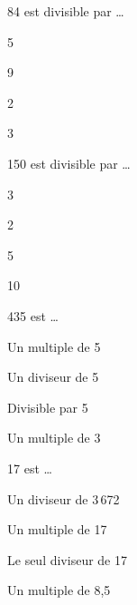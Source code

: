 \begin{QCM}
  \begin{GroupeQCM} 
    \begin{exercice}
      84 est divisible par \ldots
      \begin{ChoixQCM}{4}
      \item 5
      \item 9
      \item 2
      \item3
      \end{ChoixQCM}
\begin{corrige}
   \end{corrige}
    \end{exercice}

    \begin{exercice}
      150 est divisible par \ldots
      \begin{ChoixQCM}{4}
      \item 3
      \item 2
      \item 5
      \item 10
      \end{ChoixQCM}
\begin{corrige}
   \end{corrige}
    \end{exercice}
    
    \begin{exercice}
      435 est \ldots
      \begin{ChoixQCM}{4}
      \item Un multiple de 5
      \item Un diviseur de 5
      \item Divisible par 5
      \item Un multiple de 3
      \end{ChoixQCM}
\begin{corrige}
   \end{corrige}
    \end{exercice}

    \begin{exercice}
      17 est \ldots
      \begin{ChoixQCM}{4}
      \item Un diviseur de 3\,672
      \item Un multiple de 17
      \item Le seul diviseur de 17
      \item Un multiple de 8,5
      \end{ChoixQCM}
\begin{corrige}
   \end{corrige}
    \end{exercice}


\end{GroupeQCM}
\end{QCM}
